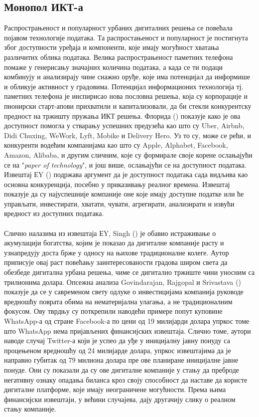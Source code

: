 \documentclass{article}
\begin{document}
\subsection{Монопол ИКТ-а}
Распрострањеност и популарност урбаних дигиталних решења се повећала појавом технологије података. Та распростањеност и популарност је постигнута због доступности уређаја и компоненти, које имају могућност хватања различитих облика података. Велика распрострањеност паметних телефона помаже у генерисању значајних количина података, а када се ти подаци комбинују и анализирају чине снажно оруђе, које има потенцијал да информише и обликује активност у градовима. Потенцијал информационих технологија тј. паметних телефона је инспирисао нова пословна решења, која су корпорације и пионирски старт-апови прихватили и капитализовали, да би стекли конкурентску предност на тржишту пружања ИКТ решења. Флорида (\cite{florida_2018}) показује како је ова доступност помогла у стварању успешних предузећа као што су Uber, Airbnb, Didi Chuxing, WeWork, Lyft, Mobike и Delivery Hero. Уз то су, може се рећи, и конкуренти водећим компанијама као што су Apple, Alphabet, Facebook, Amazon, Alibaba, и другим сличним, које су формирале своје корене ослањајући се на "\textit{paper of technology}", и још више, ослањајући се на доступност података. Извештај ЕY (\cite{ey_2014}) подржава аргумент да је доступност података сада видљива као основна конкуренција, посебно у приказивању реалног времена. Извештај показује да су најуспешније компаније оне које имају доступне податке или ће управљати, инвестирати, хватати, чувати, агрегирати, анализирати и извући вредност из доступних података.
\\\\
Слично налазима из извештаја ЕY, Singh (\cite{s_2019}) је обавио истраживање о акумулацији богатства, којим је показао да дигиталне компаније расту и узнапредују доста брже у односу на њихове традиционалне колеге. Аутор приписује овај раст повећању заинтересованости градова широм света да обезбеде дигитална урбана решења, чиме се дигитално тржиште чини уносним са трилионима долара.  Опсежна анализа Govindarajan, Rajgopal и Srivastava (\cite{g_r_s_2018}) показује да се у савременом свету одлуке о инвестицијама компанија руководе вредношћу поврата обима на нематеријална улагања, а не традиционалним фокусом. Ову тврдњу су поткрепили наводећи примере попут куповине WhatsApp-а од стране Facebook-а по цени од 19 милијарди долара упркос томе што WhatsApp нема пријављених финансијских извештаја. Слично томе, аутори наводе случај Twitter-а који је успео да уђе у иницијалну јавну понуду са процењеном вредношћу од 24 милијарде долара, упркос извештајима да је направио губитак од 79 милиона долара пре ове планиране иницијалне јавне понуде. Они су показали да су ове дигиталне компаније у стању да преброде негативну ознаку опадања биланса кроз своју способност да наставе да користе дигиталне платформе, које имају неограничене могућности. Према њима финансијски извештаји, у већини случајева, дају другачију слику о реалном стању компаније.
\end{document}
